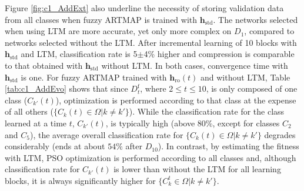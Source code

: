 Figure \ref{fig:c1_AddExt} also underline the necessity of storing validation data from all classes when fuzzy ARTMAP is trained with $\textbf{h}_\text{std}$. The networks selected when using LTM are more accurate, yet only more complex on $D_1$, compared to networks selected without the LTM. After incremental learning of 10 blocks with $\textbf{h}_\text{std}$ and LTM, classification rate is 5$\pm$4\% higher and compression is comparable to that obtained with $\textbf{h}_\text{std}$ without LTM. In both cases, convergence time with $\textbf{h}_\text{std}$ is one.
For fuzzy ARTMAP trained with $\textbf{h}_\text{ro}(t)$ and without LTM, Table \ref{tab:c1_AddEvo} shows that since $D_t^\text{f}$, where $2\leq t\leq10$, is only composed of one class ($C_{k'}(t)$), optimization is performed according to that class at the expense of all others ($\{C_k(t)\in \Omega|k\neq k'\}$).
While the classification rate for the class learned at a time $t$, $C_{k'}(t)$, is typically high (above 80\%, except for classes $C_2$ and $C_5$), the average overall classification rate for $\{C_k(t)\in \Omega|k\neq k'\}$ degrades considerably (ends at about $54\%$ after $D_{10}$).
In contrast, by estimating the fitness with LTM, PSO optimization is performed according to all classes and, although classification rate for $C_{k'}(t)$ is lower than without the LTM for all learning blocks, it is always significantly higher for $\{C_k^t\in \Omega|k\neq k'\}$.

